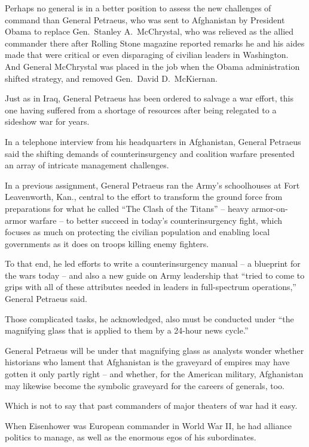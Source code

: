 ﻿\documentclass[12pt]{article}
\begin{document}
Perhaps no general is in a better position to assess the new challenges of command than General
Petraeus, who was sent to Afghanistan by President Obama to replace Gen.~Stanley A.~McChrystal, who
was relieved as the allied commander there after Rolling Stone magazine reported remarks he and his
aides made that were critical or even disparaging of civilian leaders in Washington. And General
McChrystal was placed in the job when the Obama administration shifted strategy, and removed
Gen.~David D.~McKiernan.

Just as in Iraq, General Petraeus has been ordered to salvage a war effort, this one having suffered
from a shortage of resources after being relegated to a sideshow war for years.

In a telephone interview from his headquarters in Afghanistan, General Petraeus said the shifting
demands of counterinsurgency and coalition warfare presented an array of intricate management
challenges.

In a previous assignment, General Petraeus ran the Army's schoolhouses at Fort Leavenworth, Kan.,
central to the effort to transform the ground force from preparations for what he called ``The Clash
of the Titans'' -- heavy armor-on-armor warfare -- to better succeed in today's counterinsurgency
fight, which focuses as much on protecting the civilian population and enabling local governments as
it does on troops killing enemy fighters.

To that end, he led efforts to write a counterinsurgency manual -- a blueprint for the wars today --
and also a new guide on Army leadership that ``tried to come to grips with all of these attributes
needed in leaders in full-spectrum operations,'' General Petraeus said.

Those complicated tasks, he acknowledged, also must be conducted under ``the magnifying glass that
is applied to them by a 24-hour news cycle.''

General Petraeus will be under that magnifying glass as analysts wonder whether historians who
lament that Afghanistan is the graveyard of empires may have gotten it only partly right -- and
whether, for the American military, Afghanistan may likewise become the symbolic graveyard for the
careers of generals, too.

Which is not to say that past commanders of major theaters of war had it easy.

When Eisenhower was European commander in World War II, he had alliance politics to manage, as well
as the enormous egos of his subordinates.
\end{document}
